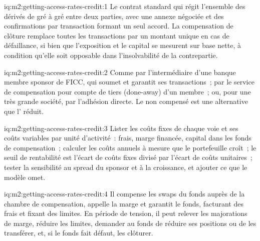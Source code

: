 \begin{solution}{iq:m2:getting-access-rates-credit:1}
Le contrat standard qui régit l'ensemble des dérivés de gré à gré entre deux parties, avec une
annexe négociée et des confirmations par transaction formant un seul accord. La compensation de clôture
remplace toutes les transactions par un montant unique en cas de défaillance, si bien que l'exposition et le capital
se mesurent sur base nette, à condition qu'elle soit opposable dans l'insolvabilité de la contrepartie.
\end{solution}

\begin{solution}{iq:m2:getting-access-rates-credit:2}
Comme  par l'intermédiaire d'une banque membre sponsor de FICC, qui soumet et
garantit ses transactions~; par le service de compensation pour compte de tiers (done-away) d'un membre~; ou, pour une
très grande société, par l'adhésion directe. Le  non compensé est une alternative que
l' réduit.
\end{solution}

\begin{solution}{iq:m2:getting-access-rates-credit:3}
Lister les coûts fixes de chaque voie et ses coûts variables par unité d'activité~: frais,
marge financée, capital dans les fonds de compensation~; calculer les coûts annuels à mesure que le portefeuille croît~; le
seuil de rentabilité est l'écart de coûts fixes divisé par l'écart de coûts unitaires~; tester la
sensibilité au spread du sponsor et à la croissance, et ajouter ce que le modèle omet.
\end{solution}

\begin{solution}{iq:m2:getting-access-rates-credit:4}
Il compense les swaps du fonds auprès de la chambre de compensation, appelle la marge et garantit le fonds,
facturant des frais et fixant des limites. En période de tension, il peut relever les majorations de marge, réduire les limites,
demander au fonds de réduire ses positions ou de les transférer, et, si le fonds fait défaut, les clôturer.
\end{solution}

